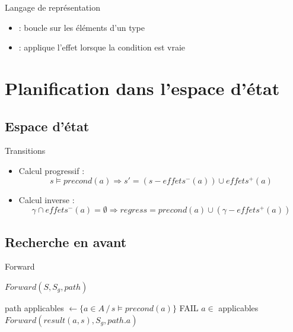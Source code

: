 \documentclass[compress]{beamer}
\begin{document}
\begin{frame}{Langage de représentation}
\begin{itemize}
\item {} : boucle sur les éléments d'un type
\item {} : applique l'effet lorsque la condition est vraie
\end{itemize}
\end{frame}

\section{Planification dans l'espace d'état}
\begin{frame}
\tableofcontents[hideothersubsections]
\end{frame}

\subsection{Espace d'état}
\begin{frame}{Transitions}
\begin{itemize}
\item Calcul progressif : 
	$$ s \models precond(a) \Rightarrow s' = (s - effets^-(a)) \cup effets^+(a)$$
\item Calcul inverse : 
	$$ \gamma \cap effets^-(a) = \emptyset \Rightarrow regress = precond(a) \cup (\gamma - effets^+(a))$$
\end{itemize}
\end{frame}

\subsection{Recherche en avant}
\begin{frame}{Forward}
\begin{block}{$Forward(S, S_g, path)$}
	\begin{algorithmic}
		\RETURN path
	\ELSE
		\STATE applicables $\leftarrow \{ a \in A \, / \, s \models precond(a) \}$
			\RETURN FAIL
		\ELSE
			\STATE {} $a \in$ applicables
			\RETURN $Forward(result(a, s), S_g, path.a)$
		\ENDIF
	\ENDIF
	\end{algorithmic}
\end{block}
\end{frame}
\end{document}
